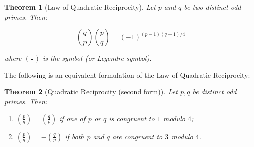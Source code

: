 \documentclass[12pt]{article}
\newtheorem*{thm}{Theorem}
\begin{document}
\begin{thm}[Law of Quadratic Reciprocity]
Let $p$ and $q$ be two distinct odd primes. Then:

$$ \left(\frac{q}{p}\right)\left(\frac{p}{q}\right)=(-1)^{(p-1)(q-1)/4} $$

where $\left(\frac{\cdot}{\cdot}\right)$ is the   symbol (or Legendre symbol).
\end{thm}

The following is an equivalent formulation of the Law of Quadratic Reciprocity: 

\begin{thm}[Quadratic Reciprocity (second form)]
Let $p,q$ be distinct odd primes. Then:
\begin{enumerate}
\item $\displaystyle \left(\frac{p}{q}\right) = \left(\frac{q}{p}\right)$ if one of $p$ or $q$ is congruent to $1$ modulo $4$;

\item $\displaystyle \left(\frac{p}{q}\right) = - \left(\frac{q}{p}\right)$ if both $p$ and $q$ are congruent to $3$ modulo $4$.
\end{enumerate}
\end{thm}
\end{document}
